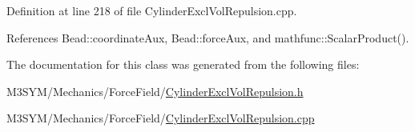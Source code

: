 Definition at line 218 of file Cylinder\+Excl\+Vol\+Repulsion.\+cpp.



References Bead\+::coordinate\+Aux, Bead\+::force\+Aux, and mathfunc\+::\+Scalar\+Product().



The documentation for this class was generated from the following files\+:\begin{DoxyCompactItemize}
\item 
M3\+S\+Y\+M/\+Mechanics/\+Force\+Field/\hyperlink{CylinderExclVolRepulsion_8h}{Cylinder\+Excl\+Vol\+Repulsion.\+h}\item 
M3\+S\+Y\+M/\+Mechanics/\+Force\+Field/\hyperlink{CylinderExclVolRepulsion_8cpp}{Cylinder\+Excl\+Vol\+Repulsion.\+cpp}\end{DoxyCompactItemize}

